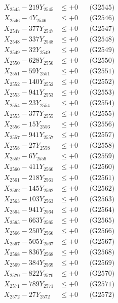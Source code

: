 \documentclass[a4paper,10pt]{article}
\begin{document}
{\begin{align}
X_{2545} - 219Y_{2545} &\leq +0 && \text{(G2545)} \\
X_{2546} - 4Y_{2546} &\leq +0 && \text{(G2546)} \\
X_{2547} - 377Y_{2547} &\leq +0 && \text{(G2547)} \\
X_{2548} - 337Y_{2548} &\leq +0 && \text{(G2548)} \\
X_{2549} - 32Y_{2549} &\leq +0 && \text{(G2549)} \\
X_{2550} - 628Y_{2550} &\leq +0 && \text{(G2550)} \\
\allowbreak
X_{2551} - 59Y_{2551} &\leq +0 && \text{(G2551)} \\
X_{2552} - 140Y_{2552} &\leq +0 && \text{(G2552)} \\
X_{2553} - 941Y_{2553} &\leq +0 && \text{(G2553)} \\
X_{2554} - 23Y_{2554} &\leq +0 && \text{(G2554)} \\
X_{2555} - 377Y_{2555} &\leq +0 && \text{(G2555)} \\
X_{2556} - 15Y_{2556} &\leq +0 && \text{(G2556)} \\
X_{2557} - 941Y_{2557} &\leq +0 && \text{(G2557)} \\
X_{2558} - 27Y_{2558} &\leq +0 && \text{(G2558)} \\
X_{2559} - 6Y_{2559} &\leq +0 && \text{(G2559)} \\
X_{2560} - 411Y_{2560} &\leq +0 && \text{(G2560)} \\
\allowbreak
X_{2561} - 218Y_{2561} &\leq +0 && \text{(G2561)} \\
X_{2562} - 145Y_{2562} &\leq +0 && \text{(G2562)} \\
X_{2563} - 103Y_{2563} &\leq +0 && \text{(G2563)} \\
X_{2564} - 941Y_{2564} &\leq +0 && \text{(G2564)} \\
X_{2565} - 663Y_{2565} &\leq +0 && \text{(G2565)} \\
X_{2566} - 250Y_{2566} &\leq +0 && \text{(G2566)} \\
X_{2567} - 505Y_{2567} &\leq +0 && \text{(G2567)} \\
X_{2568} - 836Y_{2568} &\leq +0 && \text{(G2568)} \\
X_{2569} - 384Y_{2569} &\leq +0 && \text{(G2569)} \\
X_{2570} - 822Y_{2570} &\leq +0 && \text{(G2570)} \\
\allowbreak
X_{2571} - 789Y_{2571} &\leq +0 && \text{(G2571)} \\
X_{2572} - 27Y_{2572} &\leq +0 && \text{(G2572)} \\

\end{align}}
\end{document}
